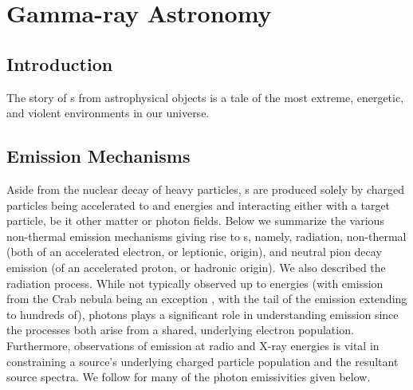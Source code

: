 \chapter{Gamma-ray Astronomy }
\label{chap:gamAstr}

\begin{figure}[h!]%
	\centering
\end{figure}




\section{Introduction}\label{gamAstr:intro}
The story of \gam{}s from astrophysical objects is a tale of the most extreme, energetic, and violent environments in our universe. 

\section{\gam{} Emission Mechanisms }\label{gamAstr:Emiss}

Aside from the  nuclear decay of heavy particles, \gam{}s are produced solely by charged particles being accelerated to\gev{} and\tev{} energies and interacting either with a target particle, be it other matter or photon fields.  Below we summarize the various non-thermal emission mechanisms giving rise to \gam{}s, namely, \ic{} radiation, non-thermal \brems{} (both of an accelerated electron, or leptionic, origin), and neutral pion decay emission (of an accelerated proton, or hadronic origin). We also described the \sync{} radiation process. While not typically observed up to \gam{} energies (with \sync{}  emission from the Crab nebula being an exception \cite{AbdoCrab}, with the tail of the emission extending to hundreds of\mev{}), \sync{} photons plays a significant role in understanding \ic{} \gam{} emission since the processes both arise from a shared, underlying electron population. Furthermore, observations of \sync{} emission at radio and X-ray energies is vital in  constraining a source's underlying charged particle population and the resultant \gam{} source spectra. We follow \cite{Houck06} for many of the photon emissivities given below.

